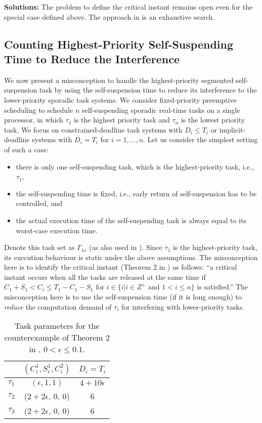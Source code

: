 {\bf Solutions:} The problem to define the critical instant remains open even for the special case defined above. The approach in \cite{ecrts15nelissen} is an exhaustive search.

\subsection{Counting Highest-Priority Self-Suspending Time to Reduce the Interference}
\label{sec:wrong-highest-priority}

We now present a misconception to handle the highest-priority segmented self-suspension task by using the self-suspension time to reduce its interference to the lower-priority sporadic task systems. 
We consider fixed-priority preemptive scheduling to schedule $n$ self-suspending sporadic real-time tasks on a single processor, in which $\tau_1$ is the highest priority task and $\tau_n$ is the lowest priority task. We focus on constrained-deadline task systems with $D_i \leq T_i$ or implicit-deadline systems with $D_i=T_i$ for $i=1,\ldots,n$.
Let us consider the simplest setting of such a case:
\begin{itemize}
\item there is only one self-suspending task, which is the highest-priority task, i.e., $\tau_1$,
\item the self-suspending time is fixed, i.e., early return of self-suspension has to be controlled, and
\item the actual execution time of the self-suspending task is always equal to its worst-case execution time.
\end{itemize}
Denote this task set as $\Gamma_{1s}$ (as also used in \cite{RTSS-KimANR13}).  Since $\tau_1$ is the highest-priority task, its execution behaviour is static under the above assumptions. The misconception here is to identify the critical instant  (Theorem 2 in \cite{RTSS-KimANR13}) as follows: ``a critical instant occurs when all the tasks are released at the same time if $C_1 +S_1 < C_i  \leq T_1-C_1-S_1 \mbox{ for } i \in\{i|i\in Z^{+} \mbox{ and } 1<i\leq n\}$ is satisfied.'' The misconception here is to use the self-suspension time (if it is long enough) to \emph{reduce} the computation demand of $\tau_i$ for interfering with lower-priority tasks. 


\begin{table} [t]
\centering
    \begin{tabular}{|c|c|c|}
 \hline
        & $(C_i^1, S_i^1, C_i^2)$ &  $D_i=T_i$\\ 
        \hline
        $\tau_1$ & $(\epsilon, 1, 1)$ &  $4+10\epsilon$\\ 
        $\tau_2$ &  ($2+2\epsilon$, 0, 0) & 6  \\ 
        $\tau_3$ & ($2+2\epsilon$, 0, 0) & 6  \\
        \hline
    \end{tabular} 
    \caption{Task parameters for the counterexample of Theorem 2 in \cite{RTSS-KimANR13}, $0 < \epsilon \leq 0.1$.}
    \label{table:ex-highest-priority}
\end{table}


